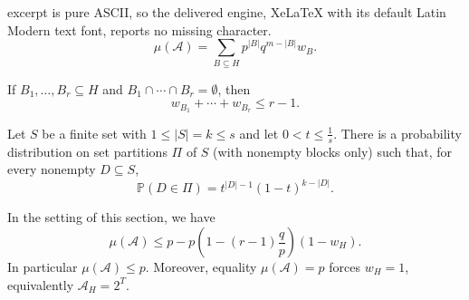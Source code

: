 \documentclass[10pt,a4paper]{amsart}
\begin{document}
excerpt is pure ASCII, so the delivered engine, XeLaTeX with its default Latin Modern text font, reports no missing character.
\begin{equation}\label{eq:slice-measure}
 \mu(\mathcal{A})=\sum_{B\subseteq H}p^{|B|}q^{m-|B|}w_B.
\end{equation}

\begin{lemma}\label{lem:slice}
If $B_1,\ldots,B_r\subseteq H$ and
$B_1\cap\cdots\cap B_r=\emptyset$, then
$$
 w_{B_1}+\cdots+w_{B_r}\le r-1.
$$
\end{lemma}

\begin{lemma}\label{lem:partition}
Let $S$ be a finite set with $1\leq |S|=k\le s$ and let $0<t\le\frac{1}{s}$.  There is a
probability distribution on set partitions $\Pi$ of $S$ (with nonempty blocks only) such that, for every
nonempty $D\subseteq S$,
$$
 \mathbb P(D\in\Pi)=t^{|D|-1}(1-t)^{k-|D|}.
$$
\end{lemma}

\begin{prop}\label{prop:slicebound}
In the setting of this section, we have
$$
 \mu(\mathcal{A})\le p-p\left(1-(r-1)\frac{q}{p}\right)(1-w_H).
$$
In particular $\mu(\mathcal{A})\le p$.  Moreover, equality $\mu(\mathcal{A})=p$ forces
$w_H=1$, equivalently $\mathcal{A}_H=2^T$.
\end{prop}
\end{document}
